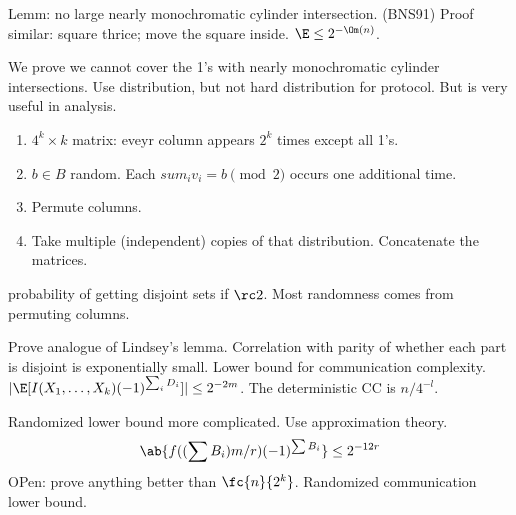 Lemm: no large nearly monochromatic cylinder intersection. (BNS91) Proof similar: square thrice; move the square inside. $\E\le 2^{-\Om(n)}$.


We prove we cannot cover the 1's with nearly monochromatic cylinder intersections.
Use distribution, but not hard distribution for protocol. But is very useful in analysis.
\begin{enumerate}
\item
$4^k\times k$ matrix: eveyr column appears $2^k$ times except all 1's. 
\item
$b\in B$ random. Each $sum_i v_i=b\pmod 2$ occurs one additional time.
\item
Permute columns.
\item Take multiple (independent) copies of that distribution. Concatenate the matrices.
\end{enumerate}
probability of getting disjoint sets if $\rc2$. Most randomness comes from permuting columns.

Prove analogue of Lindsey's lemma. Correlation with parity of whether each part is disjoint is exponentially small. 
Lower bound for communication complexity.
$|\E[I(X_1,\ldots, X_k)(-1)^{\sum_i D_i}]|\le 2^{-2m}$. The deterministic CC is $n/4^{-l}$.

Randomized lower bound more complicated. Use approximation theory. 
\[
\ab{
f((\sum B_i)m/r)(-1)^{\sum B_i}
}\le 2^{-12r}
\]
OPen: prove anything better than $\fc{n}{2^k}$. Randomized communication lower bound.

